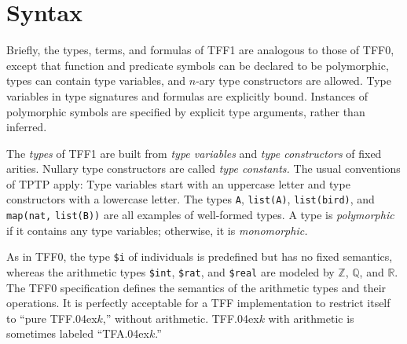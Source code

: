 \section{Syntax} \label{sec_syntax}

Briefly, the types, terms, and formulas of TFF1 are analogous to those of TFF0,
except that function and predicate symbols can be declared to be polymorphic,
types can contain type variables, and $n$-ary type constructors are allowed.
Type variables in type signatures and formulas are explicitly bound. Instances of
polymorphic symbols are specified by explicit type arguments, rather than
inferred.

 The {\em types\/} of TFF1 are built from {\em type
variables\/} and {\em type constructors\/} of fixed arities. Nullary type
constructors are called {\em type constants.} The usual conventions of TPTP
apply: Type variables start with an uppercase letter and type constructors
with a lowercase letter. The types \verb+A+, \verb+list(A)+, \verb+list(bird)+,
and \verb+map(nat,+ \verb+list(B))+ are all examples of well-formed types. A
type is {\em polymorphic} if it contains any type variables; otherwise, it is {\em
monomorphic.}

As in TFF0, the type {\tt \$i} %
of individuals is predefined but has no fixed semantics, whereas the
arithmetic types
{\tt \$int}, {\tt \$rat}, and {\tt \$real} are modeled by $\mathbb{Z}$,
$\mathbb{Q}$, and $\mathbb{R}$.
The TFF0 specification \cite{sutcliffe-et-al-2012-tff0} defines the semantics of
the arithmetic types and their operations. It is perfectly acceptable for a TFF
implementation to restrict itself to ``pure TFF\kern.04ex$k$,''
without arithmetic. %
TFF\kern.04ex$k$ with arithmetic is sometimes labeled ``TFA\kern.04ex$k$.''

